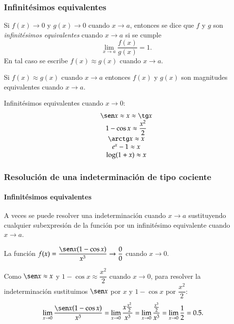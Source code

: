 	
	\begin{frame}
		\frametitle{Infinitésimos equivalentes}
		\begin{definicion}
			Si $f(x)\rightarrow 0$ y $g(x)\rightarrow 0$ cuando $x\rightarrow a$, entonces se dice que $f$ y $g$ son \emph{infinitésimos equivalentes} cuando $x\rightarrow a$ si se cumple
			\[
				\lim_{x\rightarrow a}\frac{f(x)}{g(x)}=1.
			\]
			En tal caso se escribe $f(x)\approx g(x)$ cuando $x\rightarrow a$.
		\end{definicion}
		
		Si $f(x)\approx g(x)$ cuando $x\rightarrow a$ entonces $f(x)$ y $g(x)$ son magnitudes equivalentes cuando $x\rightarrow a$.
		
		Infinitésimos equivalentes cuando $x\rightarrow 0$:
		\[
			\begin{array}{c}
				\sen x \approx x \approx \tg x  \\
				1-\cos x \approx \dfrac{x^2}{2} \\
				\arctg x \approx x              \\
				e^x-1 \approx x                 \\
				\log(1+x) \approx x             \\
			\end{array}
		\]
	\end{frame}
	
	
	\begin{frame}
		\frametitle{Resolución de una indeterminación de tipo cociente}
		\framesubtitle{Infinitésimos equivalentes}
		A veces se puede resolver una indeterminación cuando $x\rightarrow a$ sustituyendo cualquier subexpresión de la función por un infinitésimo equivalente cuando $x\rightarrow a$.
		
		 La función $f(x)=\dfrac{\sen x(1- \cos x)}{x^3}\rightarrow \dfrac{0}{0}$ cuando $x\rightarrow 0$.
		
		Como $\sen x \approx x$ y $1-\cos x\approx \dfrac{x^2}{2}$ cuando $x\rightarrow 0$, para resolver la indeterminación sustituimos $\sen x$ por $x$ y $1-\cos x$ por $\dfrac{x^2}{2}$:
		\begin{align*}
			\lim_{x\rightarrow 0}\frac{\sen x(1- \cos x)}{x^3} & = 
			\lim_{x\rightarrow 0}\dfrac{x\frac{x^2}{2}}{x^3} =
			\lim_{x\rightarrow 0}\dfrac{\frac{x^3}{2}}{x^3} = \lim_{x\rightarrow 0}\dfrac{1}{2} =0.5.
		\end{align*}
	\end{frame}
	
